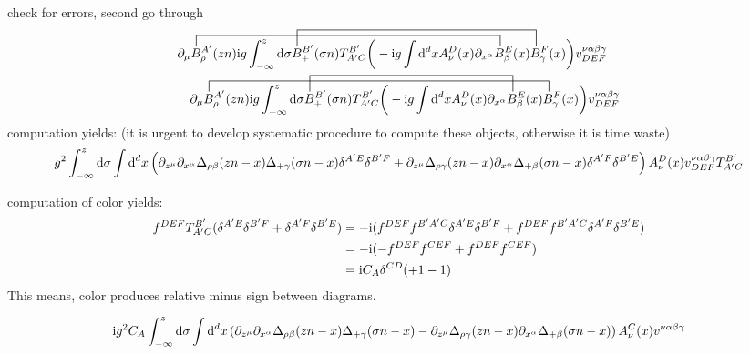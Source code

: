 {\huge{check for errors, second go through}}
\begin{align}
&\contraction[2ex]{\partial_\mu}{B}{^{A'}_\rho(zn) \imag g \int _{-\infty}^{z} \dx \sigma B_+^{B'}(\sigma n) T^{B'}_{A'C}\bigg(-\imag g \int \ddx xA_\nu^D(x) \partial_{x^\alpha}}{B}
\contraction[3ex]{\partial_\mu B^{A'}_\rho (zn) \imag g \int _{-\infty}^{z} \dx \sigma}{B}{_+^{B'}(\sigma n) T^{B'}_{A'C}\bigg(-\imag g \int \ddx xA_\nu^D(x) \partial_{x^\alpha} B_\beta^{E} (x) }{B}
\partial_\mu B^{A'}_\rho (zn) \imag g \int _{-\infty}^{z} \dx \sigma B_+^{B'}(\sigma n) T^{B'}_{A'C}\bigg(-\imag g \int \ddx xA_\nu^D(x) \partial_{x^\alpha} B_\beta^{E} (x) B_\gamma^F(x) \bigg) v^{\nu \alpha\beta\gamma}_{DEF}
\nl
\contraction[2ex]{\partial_\mu}{B}{^{A'}_\rho (zn) \imag g \int _{-\infty}^{z} \dx \sigma B_+^{B'}(\sigma n) T^{B'}_{A'C}\bigg(-\imag g \int \ddx xA_\nu^D(x) \partial_{x^\alpha} B_\beta^{E} (x) }{B}
\contraction[3ex]{\partial_\mu B^{A'}_\rho (zn) \imag g \int _{-\infty}^{z} \dx \sigma}{B}{_+^{B'}(\sigma n) T^{B'}_{A'C}\bigg(-\imag g \int \ddx xA_\nu^D(x) \partial_{x^\alpha} }{B}
\partial_\mu B^{A'}_\rho (zn) \imag g \int _{-\infty}^{z} \dx \sigma B_+^{B'}(\sigma n) T^{B'}_{A'C}\bigg(-\imag g \int \ddx xA_\nu^D(x) \partial_{x^\alpha} B_\beta^{E} (x) B_\gamma^F(x) \bigg) v^{\nu \alpha\beta\gamma}_{DEF}
\end{align}
computation yields: (it is urgent to develop systematic procedure to compute these objects, otherwise it is time waste)
\begin{align}
g^2\int_{-\infty}^z \text{d} \sigma  \int \text{d} ^d x 
\left( \partial_{z^\mu} \partial_{x^\alpha} \Delta_{\rho \beta}(zn-x) \Delta_{+ \gamma}(\sigma n -x)\delta^{A'E} \delta^{B'F} + \partial_{z^\mu}  \Delta_{\rho \gamma}(zn-x) \partial_{x^\alpha}\Delta_{+ \beta}(\sigma n -x) \delta^{A'F} \delta^{B'E} \right)A_{\nu}^{D}(x)v^{\nu \alpha\beta\gamma}_{DEF} T^{B'}_{A'C}
\end{align}

computation of color yields:
\begin{align}
f^{DEF} T^{B'}_{A'C}(\delta^{A'E} \delta^{B'F} + \delta^{A'F} \delta^{B'E})
&=
-\text{i}(f^{DEF}f^{B'A'C}\delta^{A'E} \delta^{B'F} + f^{DEF}f^{B'A'C}\delta^{A'F} \delta^{B'E})
\\
&=
-\text{i}(-f^{DEF}f^{CEF} + f^{DEF}f^{CEF})
\\
&=
\text{i} C_A\delta^{CD}(+1 -1)
\end{align}
This means, color produces relative minus sign between diagrams.

\begin{align}
\text{i} g^2 C_A \int_{-\infty}^z \text{d} \sigma  \int \text{d} ^d x 
\left( \partial_{z^\mu} \partial_{x^\alpha} \Delta_{\rho \beta}(zn-x) \Delta_{+ \gamma}(\sigma n -x) - \partial_{z^\mu}  \Delta_{\rho \gamma}(zn-x) \partial_{x^\alpha}\Delta_{+ \beta}(\sigma n -x) \right)A_{\nu}^{C}(x)v^{\nu \alpha\beta\gamma}
\end{align}

